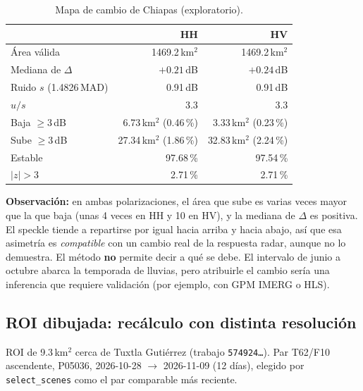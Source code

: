 \documentclass[11pt,a4paper]{article}
\begin{document}
\begin{table}[h]
\centering
\begin{tabular}{lrr}
\toprule
 & HH & HV \\
\midrule
Área válida & 1469.2\,km$^2$ & 1469.2\,km$^2$ \\
Mediana de $\Delta$ & $+0.21$\,dB & $+0.24$\,dB \\
Ruido $s$ (1.4826\,MAD) & 0.91\,dB & 0.91\,dB \\
$u/s$ & 3.3 & 3.3 \\
Baja $\ge 3$\,dB & 6.73\,km$^2$ (0.46\,\%) & 3.33\,km$^2$ (0.23\,\%) \\
Sube $\ge 3$\,dB & 27.34\,km$^2$ (1.86\,\%) & 32.83\,km$^2$ (2.24\,\%) \\
Estable & 97.68\,\% & 97.54\,\% \\
$|z|>3$ & 2.71\,\% & 2.71\,\% \\
\bottomrule
\end{tabular}
\caption{Mapa de cambio de Chiapas (exploratorio).}
\end{table}

\textbf{Observación:} en ambas polarizaciones, el área que sube es varias veces mayor que la que
baja (unas 4 veces en HH y 10 en HV), y la mediana de $\Delta$ es positiva. El speckle tiende a
repartirse por igual hacia arriba y hacia abajo, así que esa asimetría es \emph{compatible} con un
cambio real de la respuesta radar, aunque no lo demuestra. El método
\textbf{no} permite decir a qué se debe. El intervalo de junio a octubre abarca la temporada de lluvias,
pero atribuirle el cambio sería una inferencia que requiere validación (por ejemplo, con GPM IMERG o
HLS).

\subsection{ROI dibujada: recálculo con distinta resolución}

ROI de 9.3\,km$^2$ cerca de Tuxtla Gutiérrez (trabajo \texttt{574924\dots}). Par T62/F10
ascendente, P05036, 2026-10-28 $\rightarrow$ 2026-11-09 (12 días), elegido por
\texttt{select\_scenes} como el par comparable más reciente.
\end{document}
